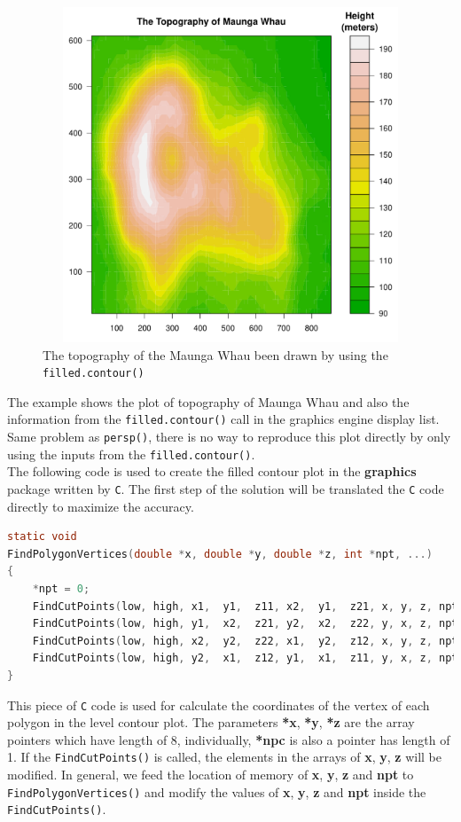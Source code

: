 \documentclass[11pt,twoside]{report}
\begin{document}
\begin{figure}[h]
	\begin{center}
		\includegraphics[height = 10cm, width = 12cm]{figure/filled_example_1.pdf}
		\caption{The topography of the Maunga Whau been drawn by using the \texttt{filled.contour()}}
		\label{figure_3.6}
	\end{center}
\end{figure}

The example shows the plot of topography of Maunga Whau and also the information from the \texttt{filled.contour()} call in the graphics engine display list. Same problem as \texttt{persp()}, there is no way to reproduce this plot directly by only using the inputs from the \texttt{filled.contour()}.\\

The following code is used to create the filled contour plot in the \textbf{graphics} package written by \texttt{C}. The first step of the solution will be translated the \texttt{C} code directly to maximize the accuracy.\\

\begin{lstlisting}[language = C]
static void
FindPolygonVertices(double *x, double *y, double *z, int *npt, ...)
{
    *npt = 0;
    FindCutPoints(low, high, x1,  y1,  z11, x2,  y1,  z21, x, y, z, npt);
    FindCutPoints(low, high, y1,  x2,  z21, y2,  x2,  z22, y, x, z, npt);
    FindCutPoints(low, high, x2,  y2,  z22, x1,  y2,  z12, x, y, z, npt);
    FindCutPoints(low, high, y2,  x1,  z12, y1,  x1,  z11, y, x, z, npt);
}
\end{lstlisting}
This piece of \texttt{C} code is used for calculate the coordinates of the vertex of each polygon in the level contour plot. The parameters \textbf{*x}, \textbf{*y}, \textbf{*z} are the array pointers which have length of 8, individually, \textbf{*npc} is also a pointer has length of 1. If the \texttt{FindCutPoints()} is called, the elements in the arrays of \textbf{x}, \textbf{y}, \textbf{z} will be modified. In general, we feed the location of memory of \textbf{x}, \textbf{y}, \textbf{z} and \textbf{npt} to \texttt{FindPolygonVertices()} and modify the values of \textbf{x}, \textbf{y}, \textbf{z} and \textbf{npt} inside the \texttt{FindCutPoints()}.\\
\end{document}
